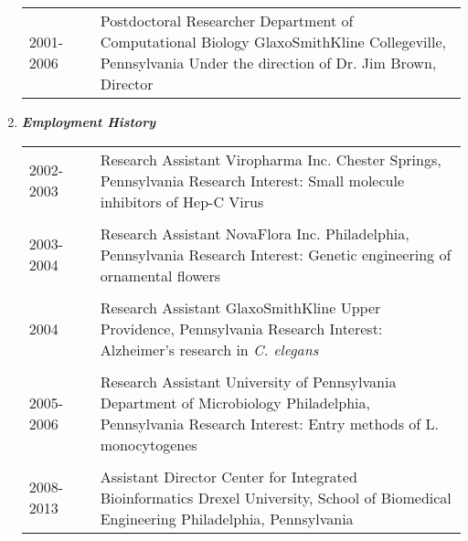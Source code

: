 \documentclass[a4paper,11pt]{article}
\begin{document}
\begin{enumerate}
 \begin{longtable}{p{}p{}p{}}
  2001-2006 & & Postdoctoral Researcher \newline Department of Computational Biology \newline GlaxoSmithKline Collegeville, Pennsylvania \newline Under the direction of Dr. Jim Brown, Director \\
 \end{longtable}
 \item {\LARGE \itshape \bfseries Employment History}
  \begin{longtable}{p{}p{}p{}}
  2002-2003 & & Research Assistant \newline Viropharma Inc. \newline Chester Springs, Pennsylvania \newline Research Interest: Small molecule inhibitors of Hep-C Virus\\
  \\
  2003-2004 & & Research Assistant \newline NovaFlora Inc. \newline Philadelphia, Pennsylvania \newline Research Interest: Genetic engineering of ornamental flowers\\
  \\
  2004 & & Research Assistant \newline GlaxoSmithKline \newline Upper Providence, Pennsylvania \newline Research Interest: Alzheimer’s research in \emph{C. elegans}\\
  \\
  2005-2006 & & Research Assistant \newline University of Pennsylvania \newline Department of Microbiology \newline Philadelphia, Pennsylvania \newline Research Interest: Entry methods of L. monocytogenes\\
  \\
  2008-2013 & & Assistant Director \newline Center for Integrated Bioinformatics \newline Drexel University, School of Biomedical Engineering \newline Philadelphia, Pennsylvania\\

\end{longtable}
\end{enumerate}
\end{document}
